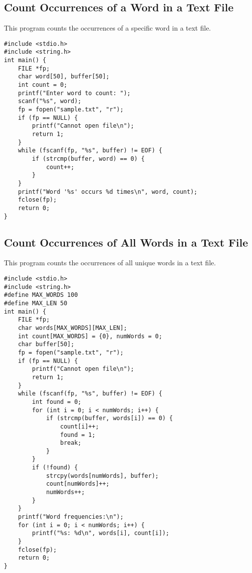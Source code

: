 \documentclass[a4paper,12pt]{article}
\begin{document}
\subsection{Count Occurrences of a Word in a Text File}
This program counts the occurrences of a specific word in a text file.
\begin{lstlisting}[caption={Count Occurrences of a Word in a Text File}]
#include <stdio.h>
#include <string.h>
int main() {
    FILE *fp;
    char word[50], buffer[50];
    int count = 0;
    printf("Enter word to count: ");
    scanf("%s", word);
    fp = fopen("sample.txt", "r");
    if (fp == NULL) {
        printf("Cannot open file\n");
        return 1;
    }
    while (fscanf(fp, "%s", buffer) != EOF) {
        if (strcmp(buffer, word) == 0) {
            count++;
        }
    }
    printf("Word '%s' occurs %d times\n", word, count);
    fclose(fp);
    return 0;
}
\end{lstlisting}
\clearpage

\subsection{Count Occurrences of All Words in a Text File}
This program counts the occurrences of all unique words in a text file.
\begin{lstlisting}[caption={Count Occurrences of All Words in a Text File}]
#include <stdio.h>
#include <string.h>
#define MAX_WORDS 100
#define MAX_LEN 50
int main() {
    FILE *fp;
    char words[MAX_WORDS][MAX_LEN];
    int count[MAX_WORDS] = {0}, numWords = 0;
    char buffer[50];
    fp = fopen("sample.txt", "r");
    if (fp == NULL) {
        printf("Cannot open file\n");
        return 1;
    }
    while (fscanf(fp, "%s", buffer) != EOF) {
        int found = 0;
        for (int i = 0; i < numWords; i++) {
            if (strcmp(buffer, words[i]) == 0) {
                count[i]++;
                found = 1;
                break;
            }
        }
        if (!found) {
            strcpy(words[numWords], buffer);
            count[numWords]++;
            numWords++;
        }
    }
    printf("Word frequencies:\n");
    for (int i = 0; i < numWords; i++) {
        printf("%s: %d\n", words[i], count[i]);
    }
    fclose(fp);
    return 0;
}
\end{lstlisting}
\clearpage
\end{document}
